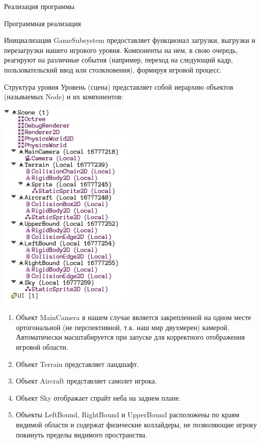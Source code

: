 \documentclass[a4paper, 14pt]{extarticle}
\numberwithin{equation}{section} %
\begin{document}
\begin{section}{Реализация программы}
\begin{subsection}{Программная реализация}
\begin{subsubsection}{Инициализация}
GameSubsystem предоставляет функционал загрузки, выгрузки и перезагрузки нашего игрового уровня.
Компоненты на нем, в свою очередь, реагируют на различные события (например, переход на следующий кадр, пользовательский ввод или столкновения), формируя игровой процесс.
\end{subsubsection}

\clearpage
\begin{subsubsection}{Структура уровня}
Уровень (сцена) представляет собой иерархию объектов (называемых Node) и их компонентов:

\includegraphics[width=250]{scene}

\begin{enumerate}
\item Объект MainCamera в нашем случае является закрепленной на одном месте ортогональной (не перспективной, т.к. наш мир двухмерен) камерой.
Автоматически масштабируется при запуске для корректного отображения игровой области.
\item Объект Terrain представляет ландшафт.
\item Объект Aircraft представляет самолет игрока.
\item Объект Sky отображает спрайт неба на заднем плане.
\item Объекты LeftBound, RightBound и UpperBound расположены по краям видимой области и содержат физические коллайдеры, не позволяющие игроку покинуть пределы видимого пространства.
\end{enumerate}


\end{subsubsection}
\end{subsection}
\end{section}
\end{document}
